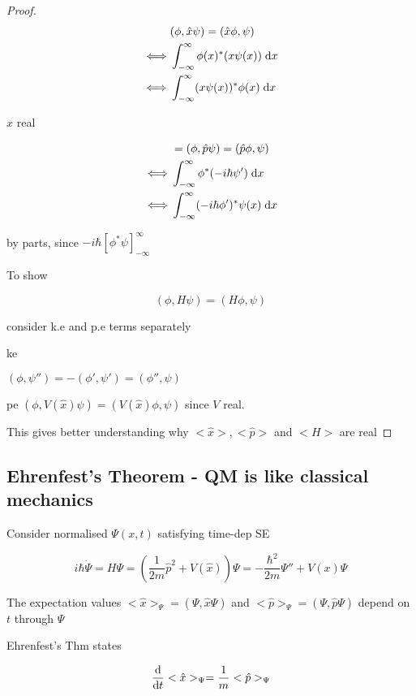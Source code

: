 \documentclass[a4paper]{article}
\begin{document}
\begin{proof}
	\begin{align*}
	& (\phi, \hat{x} \psi ) = (\hat{x}\phi, \psi ) \\
	\iff &   \int_{-\infty}^{\infty} \phi(x)^{*} (x \psi(x)) \; \mathrm{d} x \\
	\iff &  \int_{-\infty}^{\infty} (x \psi(x))^{*} \phi(x) \; \mathrm{d} x
	\end{align*}
	
	$ x $ real
	
	
	\begin{align*}
	& = (\phi, \hat{p} \psi ) = (\hat{p}\phi, \psi ) \\\iff &   \int_{-\infty}^{\infty} \phi^{*} (-i \hbar \psi') \; \mathrm{d} x \\
	\iff &  \int_{-\infty}^{\infty} (-i\hbar \phi')^{*} \psi(x) \; \mathrm{d} x
	\end{align*}
	
	by parts, since $  - i \hbar \left[  \phi^{*} \psi \right]_{-\infty}^{\infty}  $
	
	To show 
	
	\[ (\phi, H \psi) = (H \phi,\psi) \]
	
	consider k.e and p.e terms separately
	
	ke
	
	$ (\phi, \psi'') = - (\phi',\psi') = (\phi'',\psi) $
	
	pe
	$ (\phi,V(\hat{x})\psi  )  = (V(\hat{x})\phi, \psi )  $ since $ V $ real.
	
	This gives better understanding why $ <\hat{x}>, <\hat{p}> $ and $ <H>$ are real	
\end{proof}
	
\subsection{Ehrenfest's Theorem - QM is like classical mechanics}
	
Consider normalised $ \Psi(x,t) $ satisfying time-dep SE

\[ i \hbar \dot{\Psi} = H \Psi = \left(  \frac{1}{2m} \hat{p}^{2} + V (\hat{x}) \right) \Psi = - \frac{\hbar^{2}}{2m} \Psi'' + V(x) \Psi  \]

The expectation values $ <\hat{x}>_{\Psi} = (\Psi, \hat{x} \Psi) $ and $  <\hat{p}>_{\Psi} = (\Psi, \hat{p} \Psi) $ depend on $ t $ through $ \Psi $

Ehrenfest's Thm states

\[ \frac{\mathrm{d} }{\mathrm{d} t}  <\hat{x}>_{\Psi} = \frac{1}{m} <\hat{p}>_{\Psi} \]
\end{document}
